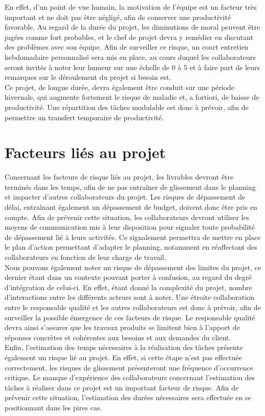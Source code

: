 En effet, d’un point de vue humain, la motivation de l’équipe est un facteur très important et ne doit pas être négligé, afin de conserver une productivité favorable. Au regard de la durée du projet, les diminutions de moral peuvent être jugées comme fort probables, et le chef de projet devra y remédier en discutant des problèmes avec son équipe. Afin de surveiller ce risque, un court entretien hebdomadaire personnalisé sera mis en place, au cours duquel les collaborateurs seront invités à noter leur humeur sur une échelle de 0 à 5 et à faire part de leurs remarques sur le déroulement du projet si besoin est. \\
 
Ce projet, de longue durée, devra également être conduit sur une période hivernale, qui augmente fortement le risque de maladie et, a fortiori, de baisse de productivité. Une répartition des tâches modulable est donc à prévoir, afin de permettre un transfert temporaire de productivité. \\
 
\section{Facteurs liés au projet}
 
Concernant les facteurs de risque liés au projet, les livrables devront être terminés dans les temps, afin de ne pas entraîner de glissement dans le planning et impacter d’autres collaborateurs du projet. Les risques de dépassement de délai, entraînant également un dépassement de budget, doivent donc être pris en compte. Afin de prévenir cette situation, les collaborateurs devront utiliser les moyens de communication mis à leur disposition pour signaler toute probabilité de dépassement lié à leurs activités. Ce signalement permettra de mettre en place le plan d’action permettant d’adapter le planning, notamment en réaffectant des collaborateurs en fonction de leur charge de travail. \\
 
Nous pouvons également noter un risque de dépassement des limites du projet, ce dernier étant dans un contexte pouvant porter à confusion, au regard du degré d’intégration de celui-ci. En effet, étant donné la complexité du projet, nombre d’interactions entre les différents acteurs sont à noter. Une étroite collaboration entre le responsable qualité et les autres collaborateurs est donc à prévoir, afin de surveiller la possible émergence de ces facteurs de risque. Le responsable qualité devra ainsi s’assurer que les travaux produits se limitent bien à l’apport de réponses concrètes et cohérentes aux besoins et aux demandes du client. \\

Enfin, l’estimation des temps nécessaires à la réalisation des tâches présente également un risque lié au projet. En effet, si cette étape n’est pas effectuée correctement, les risques de glissement présenteront une fréquence d’occurrence critique. Le manque d’expérience des collaborateurs concernant l’estimation des tâches à réaliser dans ce projet est un important facteur de risque. Afin de prévenir cette situation, l’estimation des durées nécessaires sera effectuée en se positionnant dans les pires cas. \\
